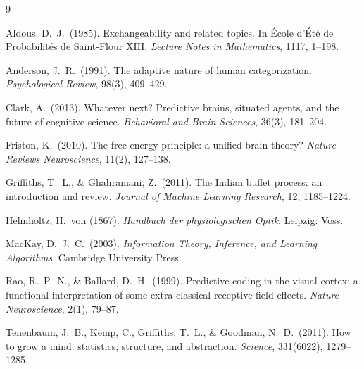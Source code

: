 \documentclass[11pt]{article}
\begin{document}
\newpage

\begin{thebibliography}{9}

 Aldous, D.\ J.\ (1985). Exchangeability and related topics. In \'Ecole d'\'Et\'e de Probabilit\'es de Saint-Flour XIII, \textit{Lecture Notes in Mathematics}, 1117, 1--198.

 Anderson, J.\ R.\ (1991). The adaptive nature of human categorization. \textit{Psychological Review}, 98(3), 409--429.

 Clark, A.\ (2013). Whatever next? Predictive brains, situated agents, and the future of cognitive science. \textit{Behavioral and Brain Sciences}, 36(3), 181--204.

 Friston, K.\ (2010). The free-energy principle: a unified brain theory? \textit{Nature Reviews Neuroscience}, 11(2), 127--138.

 Griffiths, T.\ L., \& Ghahramani, Z.\ (2011). The Indian buffet process: an introduction and review. \textit{Journal of Machine Learning Research}, 12, 1185--1224.

 Helmholtz, H.\ von (1867). \textit{Handbuch der physiologischen Optik}. Leipzig: Voss.

 MacKay, D.\ J.\ C.\ (2003). \textit{Information Theory, Inference, and Learning Algorithms}. Cambridge University Press.

 Rao, R.\ P.\ N., \& Ballard, D.\ H.\ (1999). Predictive coding in the visual cortex: a functional interpretation of some extra-classical receptive-field effects. \textit{Nature Neuroscience}, 2(1), 79--87.

 Tenenbaum, J.\ B., Kemp, C., Griffiths, T.\ L., \& Goodman, N.\ D.\ (2011). How to grow a mind: statistics, structure, and abstraction. \textit{Science}, 331(6022), 1279--1285.

\end{thebibliography}
\end{document}
